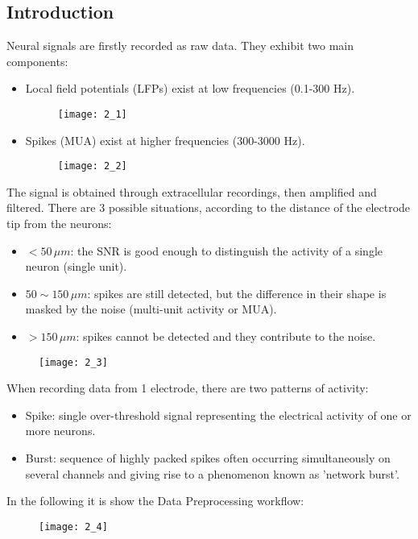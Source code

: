 \subsection{Introduction}
Neural signals are firstly recorded as raw data. They exhibit two
main components:
\begin{itemize}
    \item Local field potentials (LFPs) exist at low frequencies (0.1-300 Hz).
          \begin{figure}[H]
              \texttt{[image: 2\_1]}
              \centering
          \end{figure}
    \item Spikes (MUA) exist at higher frequencies (300-3000 Hz).
          \begin{figure}[H]
              \texttt{[image: 2\_2]}
              \centering
          \end{figure}
\end{itemize}
The signal is obtained through extracellular recordings,
then amplified and filtered. There are 3 possible situations, according to the
distance of the electrode tip from the neurons:
\begin{itemize}
    \item \(<50\,\mu{m}\): the SNR is good enough to distinguish the activity
          of a single neuron (single unit).
    \item \(50\sim150\,\mu{m}\): spikes are still detected, but the difference in
          their shape is masked by the noise (multi-unit activity or MUA).
    \item \(>150\,\mu{m}\): spikes cannot be detected and they contribute to
          the noise.
\end{itemize}
\begin{figure}[H]
    \texttt{[image: 2\_3]}
    \centering
\end{figure}
\newpage
When recording data from 1 electrode, there are two patterns of activity:
\begin{itemize}
    \item Spike: single over-threshold signal representing the electrical
          activity of one or more neurons.
    \item Burst: sequence of highly packed spikes often occurring simultaneously
          on several channels and giving rise to a phenomenon known as
          'network burst'.
\end{itemize}
In the following it is show the Data Preprocessing workflow:
\begin{figure}[H]
    \texttt{[image: 2\_4]}
    \centering
\end{figure}
